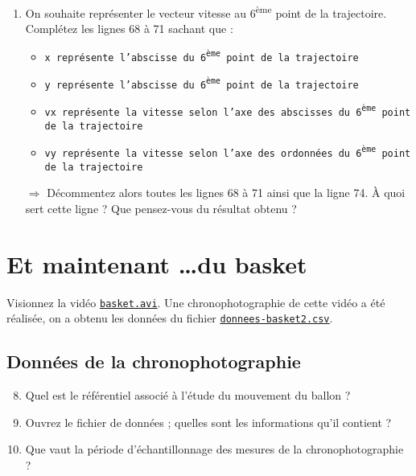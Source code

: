 \documentclass[12pt]{article}
\begin{document}
\begin{enumerate}
 
 \item \ar \com \va On souhaite représenter le vecteur vitesse au 6\textsuperscript{ème} point de la trajectoire. Complétez les lignes 68 à 71 sachant que :
 \begin{itemize}
  \item \tt{x} représente l'abscisse du 6\textsuperscript{ème} point de la trajectoire
  \item \tt{y} représente l'abscisse du 6\textsuperscript{ème} point de la trajectoire
  \item \tt{vx} représente la vitesse selon l'axe des abscisses du 6\textsuperscript{ème} point de la trajectoire
  \item \tt{vy} représente la vitesse selon l'axe des ordonnées du 6\textsuperscript{ème} point de la trajectoire
  \end{itemize}

\cpdepce

$\Longrightarrow$ Décommentez alors toutes les lignes 68 à 71 ainsi que la ligne 74. À quoi sert cette ligne ? Que pensez-vous du résultat obtenu ?

 \begin{center}
 \end{center}


\end{enumerate}








\section{Et maintenant \ldots du basket}

Visionnez la vidéo \href{https://github.com/formationPythonPC/formation20-21/tree/master/activites-2nde/3-tp-sports/basket.avi}{\underline{\texttt{basket.avi}}}. Une chronophotographie de cette vidéo a été réalisée, on a obtenu les données du fichier \href{https://github.com/formationPythonPC/formation20-21/tree/master/activites-2nde/3-tp-sports/donnees-basket2.csv}{\underline{\texttt{donnees-basket2.csv}}}.

\subsection{Données de la chronophotographie}
\begin{enumerate}
 \setcounter{enumi}{7}
 \item \rco Quel est le référentiel associé à l'étude du mouvement du ballon ?
 \item \app Ouvrez le fichier de données ; quelles sont les informations qu'il contient ?
 \item \app Que vaut la période d'échantillonnage des mesures de la chronophotographie ?
\end{enumerate}
\end{document}
